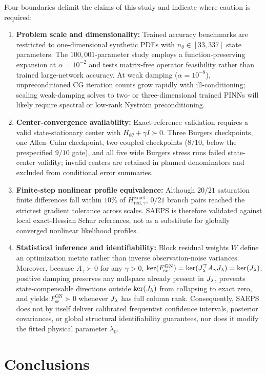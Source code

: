 \documentclass[preprint,11pt]{elsarticle}
\newcommand{\Fse}{F_{\mathrm{se}}^{\mathrm{GN}}}
\newcommand{\Hred}{H_{\mathrm{red},\gamma}^{\mathrm{exact}}}
\begin{document}
Four boundaries delimit the claims of this study and indicate where caution is required:
\begin{enumerate}
\item \textbf{Problem scale and dimensionality:} Trained accuracy benchmarks are restricted to one-dimensional synthetic PDEs with $n_\theta\in[33,337]$ state parameters. The $100{,}001$-parameter study employs a function-preserving expansion at $\alpha=10^{-2}$ and tests matrix-free operator feasibility rather than trained large-network accuracy. At weak damping ($\alpha=10^{-8}$), unpreconditioned CG iteration counts grow rapidly with ill-conditioning; scaling weak-damping solves to two- or three-dimensional trained PINNs will likely require spectral or low-rank Nystr\"om preconditioning.
\item \textbf{Center-convergence availability:} Exact-reference validation requires a valid state-stationary center with $H_{\theta\theta}+\gamma I\succ 0$. Three Burgers checkpoints, one Allen--Cahn checkpoint, two coupled checkpoints ($8/10$, below the prespecified $9/10$ gate), and all five wide Burgers stress runs failed state-center validity; invalid centers are retained in planned denominators and excluded from conditional error summaries.
\item \textbf{Finite-step nonlinear profile equivalence:} Although $20/21$ saturation finite differences fall within $10\%$ of $\Hred$, $0/21$ branch pairs reached the strictest gradient tolerance across scales. SAEPS is therefore validated against local exact-Hessian Schur references, not as a substitute for globally converged nonlinear likelihood profiles.
\item \textbf{Statistical inference and identifiability:} Block residual weights $W$ define an optimization metric rather than inverse observation-noise variances. Moreover, because $A_\gamma\succ 0$ for any $\gamma>0$, $\ker(\Fse)=\ker(\Jl^\top A_\gamma\Jl)=\ker(\Jl)$: positive damping preserves any nullspace already present in $J_\lambda$, prevents state-compensable directions outside $\ker(J_\lambda)$ from collapsing to exact zero, and yields $\Fse\succ 0$ whenever $J_\lambda$ has full column rank. Consequently, SAEPS does not by itself deliver calibrated frequentist confidence intervals, posterior covariances, or global structural identifiability guarantees, nor does it modify the fitted physical parameter $\lambda_0$.
\end{enumerate}

\section{Conclusions}
\label{sec:conclusions}
\end{document}
